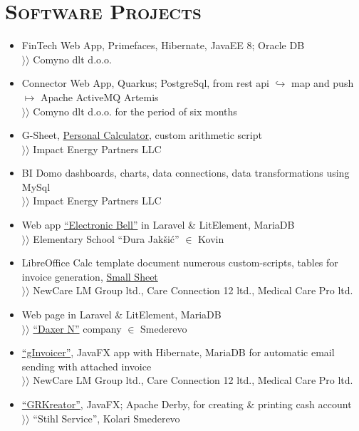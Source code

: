 \documentclass{article}
\begin{document}
\section{\textsc{Software Projects}}

\begin{itemize}[parsep=1.5pt]
\item  FinTech Web App, Primefaces, Hibernate, JavaEE 8; Oracle DB \\
$\rangle\!\rangle$ Comyno dlt d.o.o.
\item Connector Web App, Quarkus; PostgreSql, from rest api $\hookrightarrow$ map and push $\mapsto$ Apache ActiveMQ Artemis \\
$\rangle\!\rangle$ Comyno dlt d.o.o. for the period of six months
\item G-Sheet, \href{https://docs.google.com/spreadsheets/d/1ztJoonmA0d0AyNDwVE1vnjpOPPpM03JF1eWCHwfQ4ZA/edit?usp=sharing}{Personal Calculator}, custom arithmetic script \\
$\rangle\!\rangle$ Impact Energy Partners LLC
\item BI Domo dashboards, charts, data connections, data transformations using MySql \\
$\rangle\!\rangle$ Impact Energy Partners LLC
\item Web app \href{https://zvono.nastavnikinformatike.com}{``Electronic Bell''} in Laravel \& LitElement, MariaDB \\
$\rangle\!\rangle$ Elementary School ``Đura Jakšić'' $\in$ Kovin
\item LibreOffice Calc template document numerous custom-scripts, tables for invoice generation, \href{https://docs.google.com/spreadsheets/d/1Hh9O7KoN8RETCPzJl5zVYV3CQdjvu2Qtbiu3tu5O9LY/edit?usp=sharing}{Small Sheet} \\ 
$\rangle\!\rangle$ NewCare LM Group ltd., Care Connection 12 ltd., Medical Care Pro ltd.
\item Web page in Laravel \& LitElement, MariaDB \\
$\rangle\!\rangle$ \href{https://www.daxern.rs}{``Daxer N''} company $\in$ Smederevo
\item \href{https://github.com/goranrsbg/gInvoicer}{``gInvoicer''}, JavaFX app with Hibernate, MariaDB for automatic email sending with attached invoice \\
$\rangle\!\rangle$ NewCare LM Group ltd., Care Connection 12 ltd., Medical Care Pro ltd.
\item \href{https://github.com/goranrsbg/GRKreator}{``GRKreator''}, JavaFX; Apache Derby, for creating \& printing cash account \\
$\rangle\!\rangle$ ``Stihl Service'', Kolari Smederevo
\end{itemize}
\end{document}
